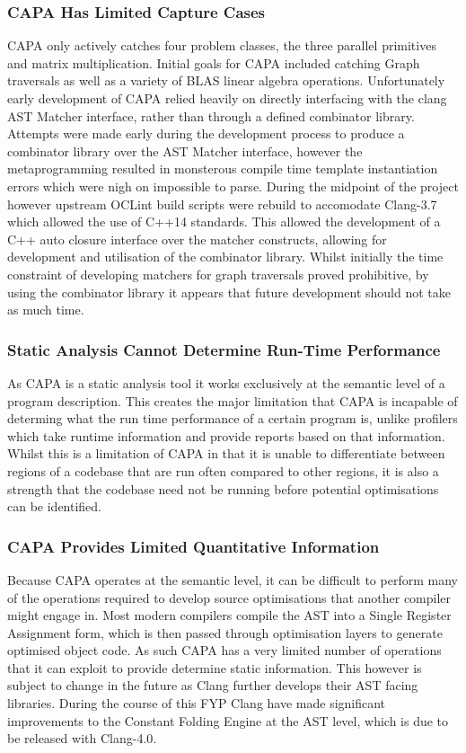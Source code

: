 \subsubsection{CAPA Has Limited Capture Cases}
CAPA only actively catches four problem classes, the three parallel primitives and matrix
multiplication. Initial goals for CAPA included catching Graph traversals as well as a variety of
BLAS linear algebra operations. Unfortunately early development of CAPA relied heavily on directly
interfacing with the clang AST Matcher interface, rather than through a defined combinator library.
Attempts were made early during the development process to produce a combinator library over the AST
Matcher interface, however the metaprogramming resulted in monsterous compile time template
instantiation errors which were nigh on impossible to parse. During the midpoint of the project
however upstream OCLint build scripts were rebuild to accomodate Clang-3.7 which allowed the use of
C++14 standards. This allowed the development of a C++ auto closure interface over the matcher
constructs, allowing for development and utilisation of the combinator library. Whilst initially
the time constraint of developing matchers for graph traversals proved prohibitive, by using the
combinator library it appears that future development should not take as much time.

\subsubsection{Static Analysis Cannot Determine Run-Time Performance}
As CAPA is a static analysis tool it works exclusively at the semantic level of a program
description. This creates the major limitation that CAPA is incapable of determing what the run time
performance of a certain program is, unlike profilers which take runtime information and provide
reports based on that information. Whilst this is a limitation of CAPA in that it is unable to
differentiate between regions of a codebase that are run often compared to other regions, it is also
a strength that the codebase need not be running before potential optimisations can be identified.

\subsubsection{CAPA Provides Limited Quantitative Information}
Because CAPA operates at the semantic level, it can be difficult to perform many of the operations
required to develop source optimisations that another compiler might engage in. Most modern
compilers compile the AST into a Single Register Assignment form, which is then passed through
optimisation layers to generate optimised object code. As such CAPA has a very limited number of
operations that it can exploit to provide determine static information. This however is subject to
change in the future as Clang further develops their AST facing libraries. During the course of this
FYP Clang have made significant improvements to the Constant Folding Engine at the AST level, which
is due to be released with Clang-4.0.

